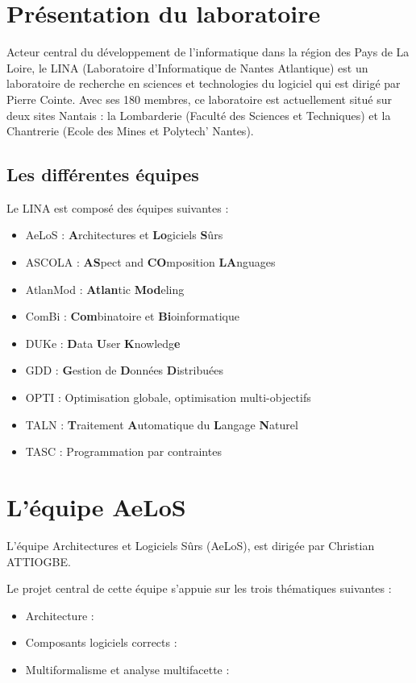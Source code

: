 \documentclass[12pt,a4paper]{report}
\begin{document}
\chapter{Présentation du laboratoire}
Acteur central du développement de l'informatique dans la région des Pays de La Loire, le LINA (Laboratoire d'Informatique de Nantes Atlantique) est un laboratoire de recherche en sciences et technologies du logiciel qui est dirigé par Pierre Cointe. Avec ses 180 membres, ce laboratoire est actuellement situé sur deux sites Nantais : la Lombarderie (Faculté des Sciences et Techniques) et la Chantrerie (Ecole des Mines et Polytech' Nantes).


\section{Les différentes équipes}
Le LINA est composé des équipes suivantes : 
\begin{itemize}
  \item AeLoS : \textbf{A}rchitectures et \textbf{Lo}giciels \textbf{S}ûrs
  \item ASCOLA : \textbf{AS}pect and \textbf{CO}mposition \textbf{LA}nguages
  \item AtlanMod : \textbf{Atlan}tic \textbf{Mod}eling 
  \item ComBi : \textbf{Com}binatoire et \textbf{Bi}oinformatique
  \item DUKe : \textbf{D}ata \textbf{U}ser \textbf{K}nowledg\textbf{e}
  \item GDD : \textbf{G}estion de \textbf{D}onnées \textbf{D}istribuées
  \item OPTI : Optimisation globale, optimisation multi-objectifs
  \item TALN : \textbf{T}raitement \textbf{A}utomatique du \textbf{L}angage \textbf{N}aturel
  \item TASC : Programmation par contraintes
\end{itemize}

\chapter{L'équipe AeLoS}	

L'équipe Architectures et Logiciels Sûrs (AeLoS), est dirigée par Christian ATTIOGBE.

Le projet central de cette équipe s'appuie sur les trois thématiques suivantes :
\begin{itemize}[label=$\circ$]
  \item Architecture : 
  \item Composants logiciels corrects : 
  \item Multiformalisme et analyse multifacette : 
\end{itemize}
\end{document}

